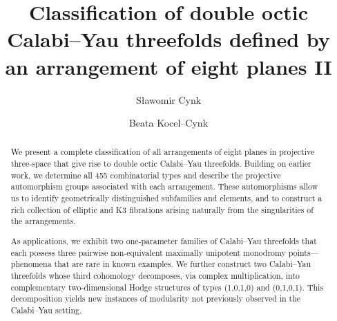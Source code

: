 \documentclass[12pt]{amsart}
\theoremstyle{plain}
\theoremstyle{remark}
\theoremstyle{definition}
\numberwithin{table}{section}
\begin{document}
\leavevmode
\def\wl#1{\hbox to 10mm{\hfill$\ifcase#1\or I_{2}\or I_{4}\or I_{0}^{*}\or I_{2}^{*}\fi$\hfill}}



\title[Classification of double octic Calabi--Yau threefolds II]
{Classification of double octic Calabi--Yau threefolds defined by an
  arrangement of eight planes II}
        \author{S{\l}awomir Cynk}
\address{Faculty of Mathematics and Computer Science, Jagiellonian University,
	{\L}ojasiewicza 6, 30-348 Krak\'ow, Poland
}
\author{Beata Kocel--Cynk}
\address{Department of Applied Mathematics\\
	Faculty of Computer Science and Telecommunications\\
	Cracow University of Technology\\
	Warszawska~24\\
	31-155~Krak\'ow\\
	POLAND}
\date{}






\maketitle
\begin{abstract}
We present a complete classification of all arrangements of eight planes in projective three‑space that give rise to double octic Calabi--Yau threefolds. Building on earlier work, we determine all 455 combinatorial types and describe the projective automorphism groups associated with each arrangement. These automorphisms allow us to identify geometrically distinguished subfamilies and elements, and to construct a rich collection of elliptic and K3 fibrations arising naturally from the singularities of the arrangements.

As applications, we exhibit two one‑parameter families of Calabi--Yau threefolds that each possess three pairwise non‑equivalent maximally unipotent monodromy points---phenomena that are rare in known examples. We further construct two Calabi--Yau threefolds whose third cohomology decomposes, via complex multiplication, into complementary two‑dimensional Hodge structures of types (1,0,1,0) and (0,1,0,1). This decomposition yields new instances of modularity not previously observed in the Calabi--Yau setting.


\end{abstract}
\end{document}
